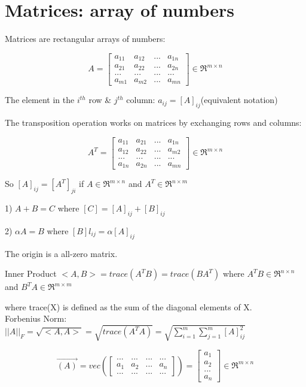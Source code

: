 \section{Matrices: array of numbers}





Matrices are rectangular arrays of numbers:

$$
A = 
\left[
\begin{matrix}
a_{11} & a_{12} & ... & a_{1n} \\
a_{21} & a_{22} & ... & a_{2n} \\
... & ... & ... & ...\\
a_{m1} & a_{m2} & ... & a_{mn}
\end{matrix}
\right] \in \Re^{m\times n}
$$


The element in the $i^{th}$ row \& $j^{th}$ column: $a_{ij} = [A]_{ij}$(equivalent notation)

The transposition operation works on matrices by exchanging rows and columns: 

$$
A^T = 
\left[
\begin{matrix}
a_{11} & a_{21} & ... & a_{1n} \\
a_{12} & a_{22} & ... & a_{m2} \\
... & ... & ... & ...\\
a_{1n} & a_{2n} & ... & a_{mn}
\end{matrix}
\right] \in \Re^{m\times n}
$$

So $[A]_{ij}  = [A^T]_{ji}$ if $A\in \Re^{m\times n}$ and $A^T\in \Re^{n\times m}$


1) $A + B = C$ where $[C] = [A]_{ij} + [B]_{ij}$

2) $\alpha A = B$ where $[B]l_{ij} = \alpha [A]_{ij}$

The origin is a all-zero matrix. 

\begin{definition}{Inner Product}
	$<A, B> = trace(A^TB) = trace(BA^T)$ where $A^TB\in \Re^{n\times n}$ and $B^TA\in \Re^{m\times m}$
\end{definition}

where trace(X) is defined as the sum of the diagonal elements of X. \\

Forbenius Norm: $||A||_F = \sqrt{<A, A>} = \sqrt{trace(A^TA)} = \sqrt{\sum^m_{i=1}\sum^m_{j=1}[A]^2_{ij}}$

$$\vec{(A)} = vec
\left(
\left[
\begin{matrix}
... & ... & ... & ... \\
a_{1} & a_{2} & ... & a_{n} \\
... & ... & ... & ...
\end{matrix}
\right]\right) = 
\left[
\begin{matrix}
a_{1} \\
a_{2} \\
... \\
a_{n}
\end{matrix}
\right]
\in \Re^{m\times n}
$$

